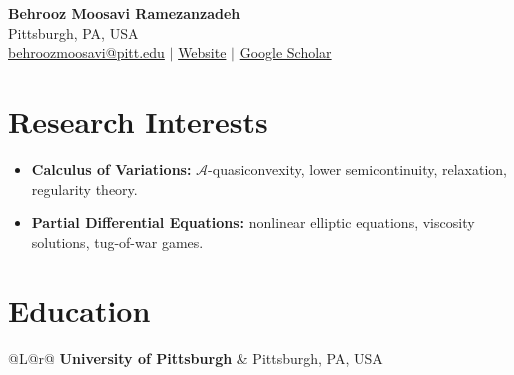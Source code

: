 \documentclass[11pt,letterpaper]{article}
\makeatletter
\newcommand{\cvline}[2]{%
  \begin{tabularx}{\linewidth}{@{}L@{\hspace{1.5em}}r@{}}
    #1 & #2
  \end{tabularx}\par}
\newcommand{\institution}[2]{\cvline{\textbf{\large #1}}{\normalsize #2}}
\newcommand{\linksep}{\hspace{1em}$\vert$\hspace{1em}}
\newcommand{\A}{\mathcal{A}}
\makeatother
\begin{document}
\begin{center}
  {\huge\bfseries Behrooz Moosavi Ramezanzadeh}\\[0.45em]
  {\small Pittsburgh, PA, USA}\\[0.30em]
  {\small
   \href{mailto:behroozmoosavi@pitt.edu}{behroozmoosavi@pitt.edu}
   \linksep
   \href{https://behroozmoosavi.github.io}{Website}
   \linksep
   \href{https://scholar.google.com/citations?user=gUWL4fIAAAAJ&hl=en}
        {Google Scholar}}
\end{center}

\section{Research Interests}

\begin{itemize}  \item \textbf{Calculus of Variations:} $\A$-quasiconvexity, lower semicontinuity, relaxation, regularity theory.  
\item \textbf{Partial Differential Equations:} nonlinear elliptic equations, viscosity solutions, tug-of-war games.
\end{itemize} 

\section{Education}

\institution{University of Pittsburgh}{Pittsburgh, PA, USA}
\end{document}
